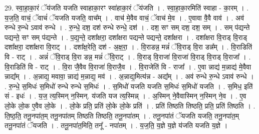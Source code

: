 \documentclass[17pt]{extarticle}
\begin{document}
29. स्वा॒हा॒का॒रं ॅय॑जति यजति स्वाहाका॒रꣳ स्वा॑हाका॒रं ॅय॑जति । . स्वा॒हा॒का॒रमिति॑ स्वाहा - का॒रम् । . य॒ज॒ति॒ वाचं॒ ॅवाचं॑ ॅयजति यजति॒ वाच᳚म् । . वाच॑ मे॒वैव वाचं॒ ॅवाच॑ मे॒व । . ए॒वावा वै॒वै वाव॑ । . अव॑ रुन्धे रु॒न्धे ऽवाव॑ रुन्धे । . रु॒न्धे॒ दश॒ दश॑ रुन्धे रुन्धे॒ दश॑ । . दश॒ सꣳ सम् दश॒ दश॒ सम् । . सम् प॑द्यन्ते पद्यन्ते॒ सꣳ सम् प॑द्यन्ते । . प॒द्य॒न्ते॒ दशा᳚क्षरा॒ दशा᳚क्षरा पद्यन्ते पद्यन्ते॒ दशा᳚क्षरा । . दशा᳚क्षरा वि॒राड् वि॒राड् दशा᳚क्षरा॒ दशा᳚क्षरा वि॒राट् । . दशा᳚क्ष॒रेति॒ दश॑ - अ॒क्ष॒रा॒ । . वि॒राडन्न॒ मन्नं॑ ॅवि॒राड् वि॒रा डन्न᳚म् । . वि॒राडिति॑ वि - राट् । . अन्नं॑ ॅवि॒राड् वि॒रा डन्न॒ मन्नं॑ ॅवि॒राट् । . वि॒राड् वि॒राजा॑ वि॒राजा॑ वि॒राड् वि॒राड् वि॒राजा᳚ । . वि॒राडिति॑ वि - राट् । . वि॒रा जै॒वैव वि॒राजा॑ वि॒राजै॒व । . वि॒राजेति॑ वि - राजा᳚ । . ए॒वा न्नाद्य॑ म॒न्नाद्य॑ मे॒वैवा न्नाद्य᳚म् । . अ॒न्नाद्य॒ मवावा॒ न्नाद्य॑ म॒न्नाद्य॒ मव॑ । . अ॒न्नाद्य॒मित्य॑न्न - अद्य᳚म् । . अव॑ रुन्धे रु॒न्धे ऽवाव॑ रुन्धे । . रु॒न्धे॒ स॒मिधः॑ स॒मिधो॑ रुन्धे रुन्धे स॒मिधः॑ । . स॒मिधो॑ यजति यजति स॒मिधः॑ स॒मिधो॑ यजति । . स॒मिध॒ इति॑ सं - इधः॑ । . य॒ज॒ त्य॒स्मिन् न॒स्मिन्. य॑जति यज त्य॒स्मिन्न् । . अ॒स्मिन् ने॒वैवास्मिन् न॒स्मिन् ने॒व । . ए॒व लो॒के लो॒क ए॒वैव लो॒के । . लो॒के प्रति॒ प्रति॑ लो॒के लो॒के प्रति॑ । . प्रति॑ तिष्ठति तिष्ठति॒ प्रति॒ प्रति॑ तिष्ठति । . ति॒ष्ठ॒ति॒ तनू॒नपा॑त॒म् तनू॒नपा॑तम् तिष्ठति तिष्ठति॒ तनू॒नपा॑तम् । . तनू॒नपा॑तं ॅयजति यजति॒ तनू॒नपा॑त॒म् तनू॒नपा॑तं ॅयजति । . तनू॒नपा॑त॒मिति॒ तनू᳚ - नपा॑तम् । . य॒ज॒ति॒ य॒ज्ञे य॒ज्ञे य॑जति यजति य॒ज्ञे । \newline
\end{document}

